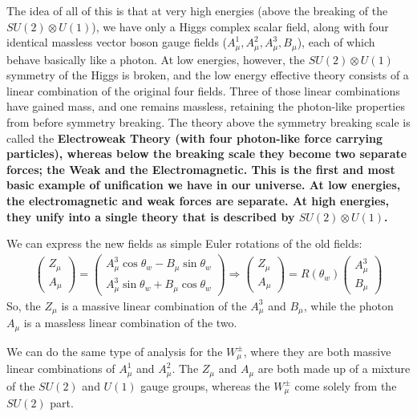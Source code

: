 \documentclass[12pt,epsf]{article}
\def\nolabel{\nonumber }
\def\nolabel{\nonumber }
\begin{document}
The idea of all of this is that at very high energies (above the
breaking of the $SU(2)\otimes U(1)$), we have only a Higgs complex
scalar field, along with four identical massless vector boson gauge
fields ($A^1_{\mu},A^2_{\mu},A^3_{\mu},B_{\mu}$), each of which behave
basically like a photon.  At low energies, however, the $SU(2)\otimes
U(1)$ symmetry of the Higgs is broken, and the low energy effective
theory consists of a linear combination of the original four fields. 
Three of those linear combinations have gained mass, and one remains
massless, retaining the photon-like properties from before symmetry
breaking.  The theory above the symmetry breaking scale is called the
\bf Electroweak Theory \rm (with four photon-like force carrying
particles), whereas below the breaking scale they become two separate
forces; the \bf Weak \rm and the \bf Electromagnetic\rm.  This is the
first and most basic example of unification we have in our universe. 
At low energies, the electromagnetic and weak forces are separate.  At
high energies, they unify into a single theory that is described by
$SU(2)\otimes U(1)$.  

We can express the new fields as simple Euler rotations of the old
fields:
\begin{eqnarray}
\begin{pmatrix}
Z_{\mu} \\ A_{\mu}
\end{pmatrix} = 
\begin{pmatrix}
A^3_{\mu} \cos\theta_w - B_{\mu} \sin\theta_w \\
A^3_{\mu} \sin\theta_w + B_{\mu} \cos\theta_w
\end{pmatrix} \Rightarrow
\begin{pmatrix}
Z_{\mu} \\ A_{\mu}
\end{pmatrix} = R(\theta_w)
\begin{pmatrix}
A^3_{\mu} \\ B_{\mu}
\end{pmatrix}\nolabel
\end{eqnarray}
So, the $Z_{\mu}$ is a massive linear combination of the $A^3_{\mu}$
and $B_{\mu}$, while the photon $A_{\mu}$ is a massless linear
combination of the two.  

We can do the same type of analysis for the $W^{\pm}_{\mu}$, where they
are both massive linear combinations of $A^1_{\mu}$ and $A^2_{\mu}$. 
The $Z_{\mu}$ and $A_{\mu}$ are both made up of a mixture of the
$SU(2)$ and $U(1)$ gauge groups, whereas the $W^{\pm}_{\mu}$ come
solely from the $SU(2)$ part.  
\end{document}
